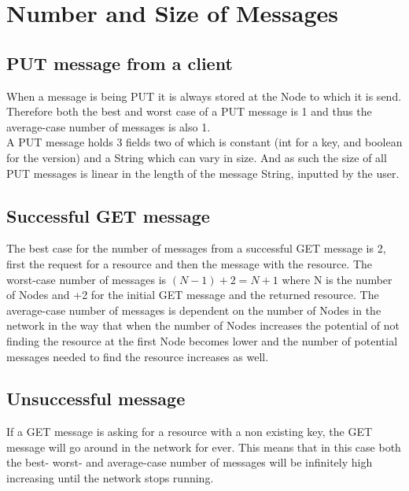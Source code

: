 \section{Number and Size of Messages}
\subsection{PUT message from a client}
When a message is being PUT it is always stored at the Node to which it is send. Therefore both the best and worst case of a PUT message is 1 and thus the average-case number of messages is also 1.\\
A PUT message holds 3 fields two of which is constant (int for a key, and boolean for the version) and a String which can vary in size.
And as such the size of all PUT messages is linear in the length of the message String, inputted by the user.

\subsection{Successful GET message}
The best case for the number of messages from a successful GET message is 2, first the request for a resource and then the message with the resource.
The worst-case number of messages is $(N-1)+2 = N+1$ where N is the number of Nodes and +2 for the initial GET message and the returned resource.
The average-case number of messages is dependent on the number of Nodes in the network in the way that when the number of Nodes increases the potential of not finding the resource at the first Node becomes lower and the number of potential messages needed to find the resource increases as well.

\subsection{Unsuccessful message}
If a GET message is asking for a resource with a non existing key, the GET message will go around in the network for ever. 
This means that in this case both the best- worst- and average-case number of messages will be infinitely high increasing until the network  stops running.